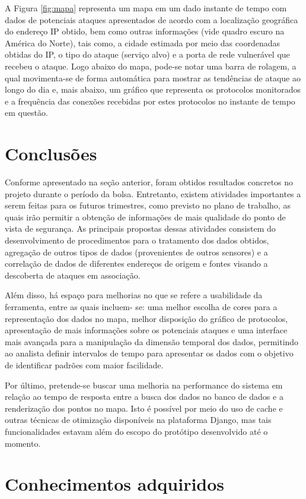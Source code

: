 \documentclass[Portuguese]
{ic-tese-v2}
\begin{document}
A Figura \ref{fig:mapa} representa um mapa em um dado instante de tempo com dados de potenciais ataques apresentados de acordo com a localização geográfica do endereço IP obtido, bem como outras informações (vide quadro escuro na América do Norte), tais como, a cidade estimada por meio das coordenadas obtidas do IP, o tipo do ataque (serviço alvo) e a porta de rede vulnerável que recebeu o ataque. Logo abaixo do mapa, pode-se notar uma barra de rolagem, a qual movimenta-se de forma automática para mostrar as tendências de ataque ao longo do dia e, mais abaixo, um gráfico que representa os protocolos monitorados e a frequência das conexões recebidas por estes protocolos no instante de tempo em questão.


\chapter{Conclusões}
Conforme apresentado na seção anterior, foram obtidos resultados concretos no projeto durante o período da bolsa. Entretanto, existem atividades importantes a serem feitas para os futuros trimestres, como previsto no plano de trabalho, as quais irão permitir a obtenção de informações de mais qualidade do ponto de vista de segurança. As principais propostas dessas atividades consistem do desenvolvimento de procedimentos para o tratamento dos dados obtidos, agregação de outros tipos de dados (provenientes de outros sensores) e a correlação de dados de diferentes endereços de origem e fontes visando a descoberta de ataques em associação.

Além disso, há espaço para melhorias no que se refere a usabilidade da ferramenta, entre as quais incluem- se: uma melhor escolha de cores para a representação dos dados no mapa, melhor disposição do gráfico de protocolos, apresentação de mais informações sobre os potenciais ataques e uma interface mais avançada para a manipulação da dimensão temporal dos dados, permitindo ao analista definir intervalos de tempo para apresentar os dados com o objetivo de identificar padrões com maior facilidade.

Por último, pretende-se buscar uma melhoria na performance do sistema em relação ao tempo de resposta entre a busca dos dados no banco de dados e a renderização dos pontos no mapa. Isto é possível por meio do uso de cache e outras técnicas de otimização disponíveis na plataforma Django, mas tais funcionalidades estavam além do escopo do protótipo desenvolvido até o momento.


\chapter{Conhecimentos adquiridos}
\end{document}
